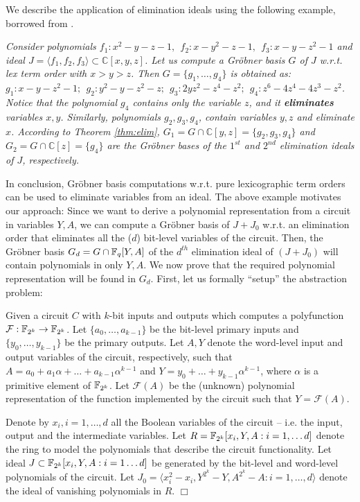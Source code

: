 We describe the application of elimination ideals using the following
example, borrowed from \cite{ideals:book}.

\begin{Example}

{\it 
Consider polynomials $f_1: x^2 - y - z - 1, ~~f_2: x - y^2 - z -1, 
~~f_3: x - y - z^2 - 1$ and ideal $J = \langle f_1, f_2, f_3\rangle
\subset {\mathbb{C}}[x, y, z]$. Let us compute a Gr\"obner basis $G$
of $J$ w.r.t. lex term order with $x > y > z$. Then $G = \{g_1, \dots,
g_4\}$ is obtained as: $g_1: x - y - z^2 - 1; ~~g_2: y^2 - y - z^2 - z;
~~g_3: 2yz^2 - z^4 - z^2; ~~g_4: z^6 - 4z^4 - 4z^3 - z^2$. 
Notice that the polynomial $g_4$ contains only the variable $z$, and
it {\bf eliminates} variables $x, y$. Similarly, polynomials $g_2,
g_3, g_4$, contain variables $y, z$ and eliminate $x$. According to
Theorem \ref{thm:elim}, $G_1 = G \cap {\mathbb{C}}[y, z] = \{g_2, g_3,
g_4\}$ and $G_2 = G \cap {\mathbb{C}}[z] = \{g_4\}$ are the Gr\"obner
bases of the $1^{st}$ and $2^{nd}$ elimination ideals of $J$, respectively.
}
\end{Example}

In conclusion, Gr\"obner basis computations w.r.t. pure lexicographic
term orders can be used to eliminate variables from an ideal. The
above example motivates our approach: Since we want to derive a
polynomial representation from a circuit in variables $Y, A$, we can
compute a Gr\"obner basis of $J + J_0$ w.r.t. an elimination order
that eliminates all the ($d$) bit-level variables of the
circuit. Then, the Gr\"obner basis $G_d = G \cap {\mathbb{F}}_{q}[Y, A]$ 
of the $d^{th}$ elimination ideal of $(J + J_0)$ will contain
polynomials in only $Y, A$. We now prove that the 
required polynomial representation will be found in $G_d$.
First, let us formally ``setup'' the abstraction problem:

\begin{Setup}\label{not:abs}
Given a circuit $C$ with $k$-bit inputs and outputs which computes a
polyfunction ${\mathcal{F}}: {\mathbb{F}}_{2^k} \rightarrow {\mathbb{F}}_{2^k}$. Let $\{a_0, \dots, a_{k-1}\}$
be the bit-level primary inputs and $\{y_0, \dots, y_{k-1}\}$ be the
primary outputs. Let $A, Y$ denote the word-level input and output
variables of the circuit, respectively, such that $A = a_0 + a_1
\alpha + \dots + a_{k-1}\alpha^{k-1}$ and $Y = y_0 + \dots +
y_{k-1}\alpha^{k-1}$, where $\alpha$ is a primitive element of ${\mathbb{F}}_{2^k}$. 
Let ${\mathcal{F}}(A)$ be the (unknown) polynomial representation of
the function implemented by the circuit such that $Y =
{\mathcal{F}}(A)$.  

Denote by $x_i, i = 1, \dots, d$ all the Boolean variables of the
circuit -- i.e. the input, output and the intermediate
variables. Let $R = {\mathbb{F}}_{2^k}[x_i, Y, A: i = 1, \dots d]$ denote the
ring to model the polynomials that describe 
the circuit functionality. Let ideal $J \subset {\mathbb{F}}_{2^k}[x_i, Y, A: i = 1
  \dots d]$ be generated by the bit-level and word-level polynomials
of the circuit. Let $J_0 = \langle x_i^2-x_i, Y^{2^k} - Y, A^{2^k} - A: i =
1, \dots, d\rangle$ denote the ideal of vanishing polynomials in $R$. 
\hfill$\Box$
\end{Setup}

